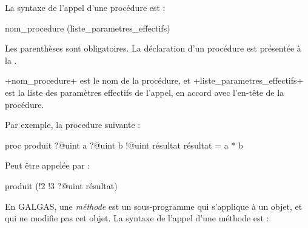 















%
















La syntaxe de l'appel d'une procédure est :
\begin{galgasbox}
nom_procedure (liste_parametres_effectifs)
\end{galgasbox}

Les parenthèses sont obligatoires. La déclaration d'un procédure est présentée à la .

\ggs+nom_procedure+ est le nom de la procédure, et \ggs+liste_parametres_effectifs+ est la liste des paramètres effectifs de l'appel, en accord avec l'en-tête de la procédure.

Par exemple, la procedure suivante :
\begin{galgas}
proc produit ?@uint a ?@uint b !@uint résultat {
  résultat = a * b
}
\end{galgas}

Peut être appelée par :
\begin{galgas}
produit (!2 !3 ?@uint résultat)
\end{galgas}
















En GALGAS, une \emph{méthode} est un sous-programme qui s'applique à un objet, et qui ne modifie pas cet objet. La syntaxe de l'appel d'une méthode est :
\begin{galgas}
\end{galgas}

